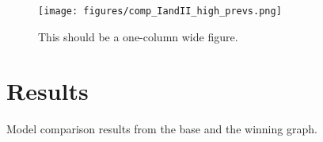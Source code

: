 \documentclass[twocolumn]{aastex631}
\begin{document}
\begin{figure}
    \begin{centering}
        \texttt{[image: figures/comp\_IandII\_high\_prevs.png]}
        \caption{This should be a one-column wide figure.}
        \label{fig:IandII_high_prevs}
    \end{centering}
\end{figure}

\section{Results}
\label{sec:results}

\begin{table}
    \centering
    \caption{Model comparison results from the base and the winning graph.}
    \label{table:evidence}
\end{table}


\end{document}
